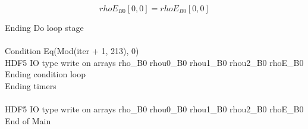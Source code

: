 \documentclass{article}
\begin{document}
\begin{dmath}{rhoE{_{B0}}}[{0,0}] = {rhoE{_{B0}}}[{0,0}]\end{dmath}

\noindent Ending Do loop stage\\
\\\noindent Condition Eq(Mod(iter + 1, 213), 0)\\\noindent HDF5 IO type write on arrays rho_B0 rhou0_B0 rhou1_B0 rhou2_B0 rhoE_B0\\\noindent Ending condition loop %
\\\noindent Ending timers\\
\\\noindent HDF5 IO type write on arrays rho_B0 rhou0_B0 rhou1_B0 rhou2_B0 rhoE_B0\\\noindent End of Main\\
\end{document}
